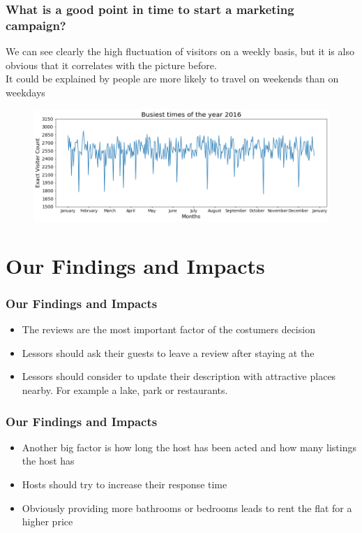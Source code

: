 \documentclass{beamer}
\begin{document}
\begin{frame}
\frametitle{What is a good point in time to start a marketing campaign?}
We can see clearly the high fluctuation of visitors on a weekly basis, but it is also obvious that it correlates with the picture before.\\It could be explained by people are more likely to travel on weekends than on weekdays
\begin{figure}
\includegraphics[width=0.8\linewidth]{photo/5_busiest_times_2016}
\end{figure}
\end{frame}
\section{Our Findings and Impacts}
\begin{frame}
\frametitle{Our Findings and Impacts}
\begin{itemize}
\item The reviews are the most important factor of the costumers decision
\item Lessors should ask their guests to leave a review after staying at the 
\item Lessors should consider to update their description with attractive places nearby. For example a lake, park or restaurants.
\end{itemize}
\end{frame}
\begin{frame}
\frametitle{Our Findings and Impacts}
\begin{itemize}
\item Another big factor is how long the host has been acted and how many listings the host has
\item Hosts should try to increase their response time
\item Obviously providing more bathrooms or bedrooms leads to rent the flat for a higher price
\end{itemize}
\end{frame}
\end{document}
